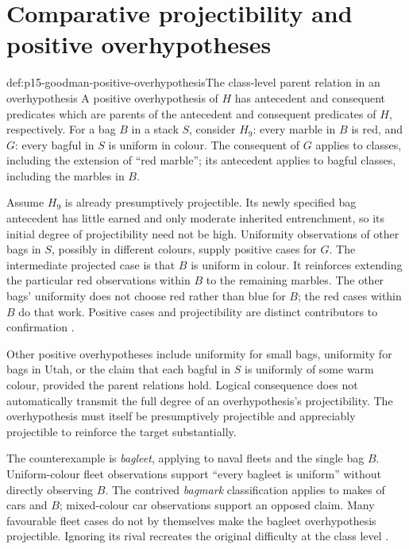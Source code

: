 \section{Comparative projectibility and positive overhypotheses}
\label{sec:p15-goodman-comparative}

\begin{hbdefinition}{def:p15-goodman-positive-overhypothesis}{The class-level parent relation in an overhypothesis}
A positive overhypothesis of $H$ has antecedent and consequent predicates
which are parents of the antecedent and consequent predicates of $H$,
respectively. For a bag $B$ in a stack $S$, consider $H_9$: every marble
in $B$ is red, and $G$: every bagful in $S$ is uniform in colour. The
consequent of $G$ applies to classes, including the extension of ``red
marble''; its antecedent applies to bagful classes, including the marbles
in $B$.
\end{hbdefinition}

Assume $H_9$ is already presumptively projectible. Its newly specified
bag antecedent has little earned and only moderate inherited entrenchment,
so its initial degree of projectibility need not be high. Uniformity
observations of other bags in $S$, possibly in different colours, supply
positive cases for $G$. The intermediate projected case is that $B$ is
uniform in colour. It reinforces extending the particular red observations
within $B$ to the remaining marbles. The other bags' uniformity does not
choose red rather than blue for $B$; the red cases within $B$ do that work.
Positive cases and projectibility are distinct contributors to confirmation
\parencite[IV.5, pp.~108--110]{Goodman1983FourthProjection}.

Other positive overhypotheses include uniformity for small bags, uniformity
for bags in Utah, or the claim that each bagful in $S$ is uniformly of
some warm colour, provided the parent relations hold. Logical consequence
does not automatically transmit the full degree
of an overhypothesis's projectibility. The overhypothesis must itself be
presumptively projectible and appreciably projectible to reinforce the
target substantially.

The counterexample is \emph{bagleet}, applying to naval fleets and the
single bag $B$. Uniform-colour fleet observations support ``every bagleet
is uniform'' without directly observing $B$. The contrived \emph{bagmark}
classification applies to makes of cars and $B$; mixed-colour car observations
support an opposed claim. Many favourable fleet cases do not by themselves
make the bagleet overhypothesis projectible. Ignoring its rival recreates
the original difficulty at the class level
\parencite[pp.~110--112]{Goodman1983FourthProjection}.

